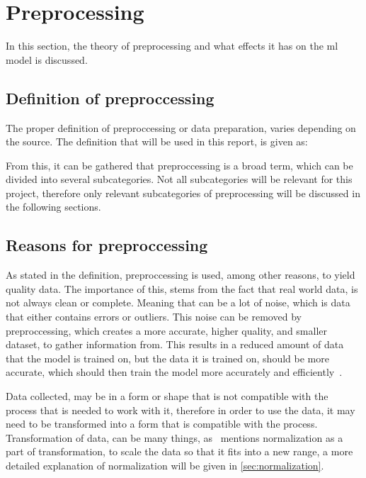 \section{Preprocessing}\label{sec:preprocessing}
In this section, the theory of preprocessing and what effects it has on the \gls{ml} model is discussed.



\subsection{Definition of preproccessing}\label{subsec:preprocessing-definition}
The proper definition of preproccessing or data preparation, varies depending on the source. The definition that will be used in this report, is given as:


From this, it can be gathered that preproccessing is a broad term, which can be divided into several subcategories. Not all subcategories will be relevant for this project, therefore only relevant subcategories of preprocessing will be discussed in the following sections.
  

\subsection{Reasons for preproccessing}\label{subsec:preprocessing-reasons}
As stated in the definition, preproccessing is used, among other reasons, to yield quality data. The importance of this, stems from the fact that real world data, is not always clean or complete. Meaning that can be a lot of noise, which is data that either contains errors or outliers. This noise can be removed by preproccessing, which creates a more accurate, higher quality, and smaller dataset, to gather information from. This results in a reduced amount of data that the model is trained on, but the data it is trained on, should be more accurate, which should then train the model more accurately and efficiently~\cite{data-preparation-for-data-mining}.


Data collected, may be in a form or shape that is not compatible with the process that is needed to work with it, therefore in order to use the data, it may need to be transformed into a form that is compatible with the process. Transformation of data, can be many things, as~\cite{Data-preprocessing-for-flight-delays} mentions normalization as a part of transformation, to scale the data so that it fits into a new range, a more detailed explanation of normalization will be given in \ref{sec:normalization}.

